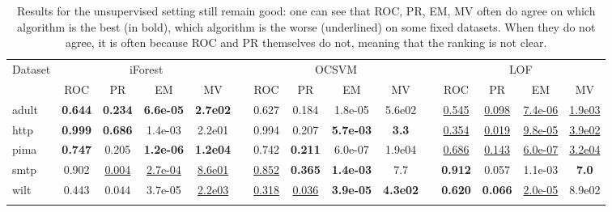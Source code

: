 \begin{table}[!ht]
\centering
\caption{Results for the unsupervised setting still remain good: one can see that ROC, PR, EM, MV often do agree on which algorithm is the best (in bold), which algorithm is the worse (underlined) on some fixed datasets. When they do not agree, it is often because ROC and PR themselves do not, meaning that the ranking is not clear.}
\label{evaluation:table:results-unsupervised}
\footnotesize
\tabcolsep=0.11cm
\resizebox{\linewidth}{!} {
\begin{tabular}{l cccc c cccc c cccc}
\toprule
Dataset      & \multicolumn{4}{c}{iForest} & & \multicolumn{4}{c}{OCSVM} & & \multicolumn{4}{c}{LOF} \\ %
  \cmidrule{1-15}
~            & ROC  & PR   & EM    &  MV  &  & ROC   & PR    & EM    & MV    &    & ROC  & PR   & EM    & MV    \\
adult        &\bf 0.644 &\bf 0.234 &\bf 6.6e-05&\bf 2.7e02 & &0.627  &0.184  &1.8e-05&5.6e02   &  &\underline{0.545} &\underline{0.098} &\underline{7.4e-06}&\underline{1.9e03} \\
http         &\bf 0.999 &\bf 0.686 &1.4e-03&2.2e01&  &0.994  &0.207  &\bf 5.7e-03&\bf 3.3    &    &\underline{0.354} &\underline{0.019} &\underline{9.8e-05}&\underline{3.9e02} \\
pima         &\bf 0.747 &0.205 &\bf 1.2e-06&\bf 1.2e04 & &0.742  &\bf 0.211  &6.0e-07&1.9e04  &   &\underline{0.686} &\underline{0.143} &\underline{6.0e-07}&\underline{3.2e04} \\
smtp         &0.902 &\underline{0.004} &\underline{2.7e-04}&\underline{8.6e01}&  &\underline{0.852}  &\bf 0.365  &\bf 1.4e-03&7.7   &     &\bf 0.912 &0.057 &1.1e-03&\bf 7.0    \\ %
wilt         &0.443 &0.044 &3.7e-05&\underline{2.2e03} & &\underline{0.318}  &\underline{0.036}  &\bf 3.9e-05&\bf 4.3e02 &    &\bf 0.620 &\bf 0.066 &\underline{2.0e-05}&8.9e02 \\  &&&&&&&&&&&&&& \\


\end{tabular}}
\end{table}
